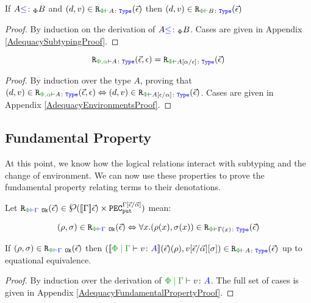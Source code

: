 \begin{framed}
    \begin{theorem}\label{LogRelSubtype}
        If $A{\color{blue} \leq\colon}_\Phi B$ and $\inLogRelPE{d}{v}{A}$ then $\inLogRelPE{d}{v}{B}$
    \end{theorem}
    
    \begin{proof}
        By induction on the derivation of $A{\color{blue} \leq\colon}_\Phi B$. Cases are given in Appendix \ref{AdequacySubtypingProof}.
    \end{proof}
\end{framed}

\begin{framed}
    \begin{lemma}\label{EnvironmentLemma}
        $$\erelates{\P,\a}{A}(\ev, \e) = \erelates{\P}{A\ssub{\e}{\a}}(\ev)$$
    \end{lemma}
    
    \begin{proof}
        By induction over the type $A$, proving that $\inLogRel{d}{v}{\P,\a}{A}{\ev, \e} \Leftrightarrow \inLogRelPE{d}{v}{A\ssub{\a}{\e}}$. Cases are given in Appendix \ref{AdequacyEnvironmentsProof}.
    \end{proof}
\end{framed}




\subsection{Fundamental Property}\label{FundProp}
At this point, we know how the logical relations interact with subtyping and the change of environment. We can now use these properties to prove the fundamental property relating terms to their denotations.

\begin{framed}
    \begin{theorem}\label{FundPropTheorem}
        Let $\erelatesg{\P}{\G}(\ev) \in \powset{\deno{\G}\ev)\times \pecput^{\G\ssub{\av}{\ev}}}$ mean:
    
        \begin{equation}
            \label{LogicalRelationTypeEnvironment}
            \inLogRelPEG{\rho}{\si}{\G} \Leftrightarrow \forall x. \inLogRelPE{\rho(x)}{\si(x)}{\G(x)}
        \end{equation}
    
    
        If $\inLogRelPEG{\rho}{\si}{\G}$ then $\inLogRelPE{\deno{\gpetyperelation{v}{A}}\fundRho}{v\fundSub}{A}$ up to equational equivalence.    
    \end{theorem}
    
    \begin{proof}
        By induction over the derivation of $\gpetyperelation{v}{A}$. The full set of  cases is given in Appendix \ref{AdequacyFundamentalPropertyProof}.
    \end{proof}
\end{framed}


